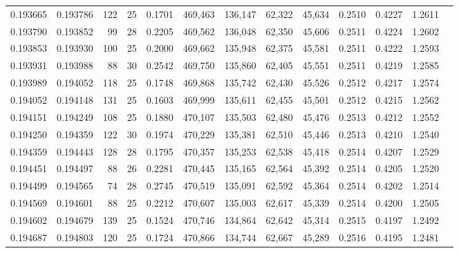 \begin{tabular}{rrrrrrrrrrrrr}
0.193665 & 0.193786 & 122 &  25 &                                     0.1701 & 469,463 & 136,147 &  62,322 &  45,634 & 0.2510 & 0.4227 & 1.2611 \\
0.193790 & 0.193852 &  99 &  28 &                                     0.2205 & 469,562 & 136,048 &  62,350 &  45,606 & 0.2511 & 0.4224 & 1.2602 \\
0.193853 & 0.193930 & 100 &  25 &                                     0.2000 & 469,662 & 135,948 &  62,375 &  45,581 & 0.2511 & 0.4222 & 1.2593 \\
0.193931 & 0.193988 &  88 &  30 &                                     0.2542 & 469,750 & 135,860 &  62,405 &  45,551 & 0.2511 & 0.4219 & 1.2585 \\
0.193989 & 0.194052 & 118 &  25 &                                     0.1748 & 469,868 & 135,742 &  62,430 &  45,526 & 0.2512 & 0.4217 & 1.2574 \\
0.194052 & 0.194148 & 131 &  25 &                                     0.1603 & 469,999 & 135,611 &  62,455 &  45,501 & 0.2512 & 0.4215 & 1.2562 \\
0.194151 & 0.194249 & 108 &  25 &                                     0.1880 & 470,107 & 135,503 &  62,480 &  45,476 & 0.2513 & 0.4212 & 1.2552 \\
0.194250 & 0.194359 & 122 &  30 &                                     0.1974 & 470,229 & 135,381 &  62,510 &  45,446 & 0.2513 & 0.4210 & 1.2540 \\
0.194359 & 0.194443 & 128 &  28 &                                     0.1795 & 470,357 & 135,253 &  62,538 &  45,418 & 0.2514 & 0.4207 & 1.2529 \\
0.194451 & 0.194497 &  88 &  26 &                                     0.2281 & 470,445 & 135,165 &  62,564 &  45,392 & 0.2514 & 0.4205 & 1.2520 \\
0.194499 & 0.194565 &  74 &  28 &                                     0.2745 & 470,519 & 135,091 &  62,592 &  45,364 & 0.2514 & 0.4202 & 1.2514 \\
0.194569 & 0.194601 &  88 &  25 &                                     0.2212 & 470,607 & 135,003 &  62,617 &  45,339 & 0.2514 & 0.4200 & 1.2505 \\
0.194602 & 0.194679 & 139 &  25 &                                     0.1524 & 470,746 & 134,864 &  62,642 &  45,314 & 0.2515 & 0.4197 & 1.2492 \\
0.194687 & 0.194803 & 120 &  25 &                                     0.1724 & 470,866 & 134,744 &  62,667 &  45,289 & 0.2516 & 0.4195 & 1.2481 \\

\end{tabular}
